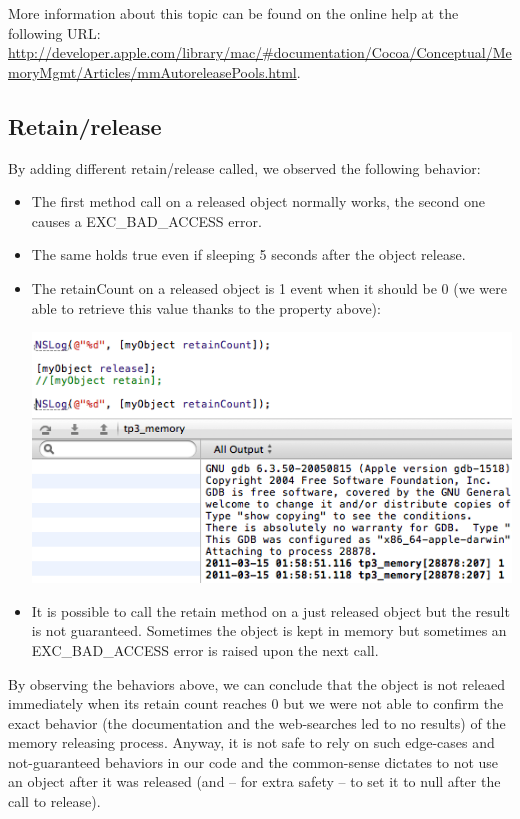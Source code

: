 \documentclass[a4paper,10pt]{article}
\begin{document}
		More information about this topic can be found on the online help at the following URL: \url{http://developer.apple.com/library/mac/#documentation/Cocoa/Conceptual/MemoryMgmt/Articles/mmAutoreleasePools.html}.
		
		\subsection{Retain/release}
		
		By adding different retain/release called, we observed the following behavior:
		
		\begin{itemize}
			\item The first method call on a released object normally works, the second one causes a EXC\_BAD\_ACCESS error.
			\item The same holds true even if sleeping 5 seconds after the object release.
			\item The retainCount on a released object is 1 event when it should be 0 (we were able to retrieve this value thanks to the property above):
			
			\includegraphics[scale=0.5]{./images/retain_count.png}
			
			\item It is possible to call the retain method on a just released object but the result is not guaranteed. Sometimes the object is kept in memory but sometimes an EXC\_BAD\_ACCESS error is raised upon the next call.
		\end{itemize}
		
		By observing the behaviors above, we can conclude that the object is not releaed immediately when its retain count reaches 0 but we were not able to confirm the exact behavior (the documentation and the web-searches led to no results) of the memory releasing process. Anyway, it is not safe to rely on such edge-cases and not-guaranteed behaviors in our code and the common-sense dictates to not use an object after it was released (and -- for extra safety -- to set it to null after the call to release).
		
\end{document}
